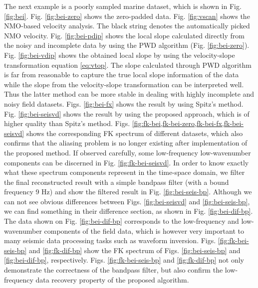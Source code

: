 The next example is a poorly sampled marine dataset, which is shown in Fig. \ref{fig:bei}. Fig. \ref{fig:bei-zero} shows the zero-padded data. Fig. \ref{fig:vscan} shows the NMO-based velocity analysis. The black string denotes the automatically picked NMO velocity. Fig. \ref{fig:bei-pdip} shows the local slope calculated directly from the noisy and incomplete data by using the PWD algorithm (Fig. \ref{fig:bei-zero}). Fig. \ref{fig:bei-vdip} shows the obtained local slope by using the velocity-slope transformation equation \ref{eq:vtop}. The slope calculated through PWD algorithm is far from reasonable to capture the true local slope information of the data while the slope from the velocity-slope transformation can be interpreted well. Thus the latter method can be more stable in dealing with highly incomplete and noisy field datasets. Figs. \ref{fig:bei-fx} shows the result by using Spitz's method. Fig. \ref{fig:bei-seisvd} shows the result by using the proposed approach, which is of higher quality than Spitz's method. Figs. \ref{fig:fk-bei,fk-bei-zero,fk-bei-fx,fk-bei-seisvd} shows the corresponding FK spectrum of different datasets, which also confirms that the aliasing problem is no longer existing after implementation of the proposed method.  If observed carefully, some low-frequency low-wavenumber components can be discerned in Fig. \ref{fig:fk-bei-seisvd}. In order to know exactly what these spectrum components represent in the time-space domain, we filter the final reconstructed result with a simple bandpass filter (with a bound frequency 9 Hz) and show the filtered result in Fig. \ref{fig:bei-seis-bp}. Although we can not see obvious differences between Figs. \ref{fig:bei-seisvd} and \ref{fig:bei-seis-bp}, we can find something in their difference section, as shown in Fig. \ref{fig:bei-dif-bp}. The data shown on Fig. \ref{fig:bei-dif-bp} corresponds to the low-frequency and low-wavenumber components of the field data, which is however very important to many seismic data processing tasks such as waveform inversion. Figs. \ref{fig:fk-bei-seis-bp} and \ref{fig:fk-dif-bp} show the FK spectrum of Figs. \ref{fig:bei-seis-bp} and \ref{fig:bei-dif-bp}, respectively. Figs. \ref{fig:fk-bei-seis-bp} and \ref{fig:fk-dif-bp} not only demonstrate the correctness of the bandpass filter, but also confirm the low-frequency data recovery property of the proposed algorithm. 




